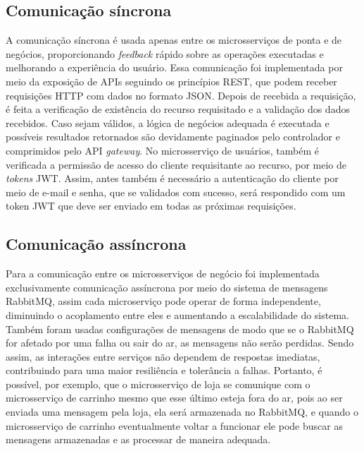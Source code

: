 


\subsection{Comunicação síncrona}
A comunicação síncrona é usada apenas entre os microsserviços de ponta e de negócios, proporcionando \emph{feedback} rápido sobre as operações executadas e melhorando a experiência do usuário. 
Essa comunicação foi implementada por meio da exposição de APIs seguindo os princípios REST, que podem receber requisições HTTP com dados no formato JSON. Depois de recebida a requisição, é feita a verificação de existência do recurso requisitado e a validação dos dados recebidos. Caso sejam válidos, a lógica de negócios adequada é executada e possíveis resultados retornados são devidamente paginados pelo controlador e comprimidos pelo API \emph{gateway}. No microsserviço de usuários, também é verificada a permissão de acesso do cliente requisitante ao recurso, por meio de \emph{tokens} JWT. Assim, antes também é necessário a autenticação do cliente por meio de e-mail e senha, que se validados com sucesso, será respondido com um token JWT que deve ser enviado em todas as próximas requisições.




\subsection{Comunicação assíncrona}
Para a comunicação entre os microsserviços de negócio foi implementada exclusivamente comunicação assíncrona por meio do sistema de mensagens RabbitMQ, assim cada microserviço pode operar de forma independente, diminuindo o acoplamento entre eles e aumentando a escalabilidade do sistema.
Também foram usadas configurações de mensagens de modo que se o RabbitMQ for afetado por uma falha ou sair do ar, as mensagens não serão perdidas.
Sendo assim, as interações entre serviços não dependem de respostas imediatas, contribuindo para uma maior resiliência e tolerância a falhas. Portanto, é possível, por exemplo, que o microsserviço de loja se comunique com o microsserviço de carrinho mesmo que esse último esteja fora do ar, pois ao ser enviada uma mensagem pela loja, ela será armazenada no RabbitMQ, e quando o microsserviço de carrinho eventualmente voltar a funcionar ele pode buscar as mensagens armazenadas e as processar de maneira adequada. 


